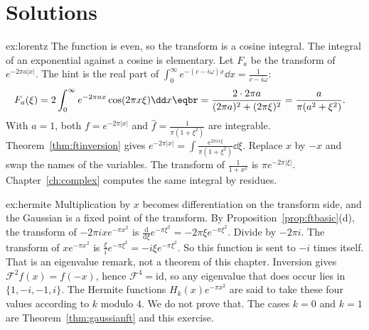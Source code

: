 \section{Solutions}

\begin{solution}{ex:lorentz}
\idea The function is even, so the transform is a cosine integral. The integral of an exponential against a cosine is elementary.
\writeup Let $F_a$ be the transform of $e^{-2\pi a|x|}$. The hint is the real part of $\int_0^\infty e^{-(c-i\omega)x}\dd x=\frac1{c-i\omega}$:
\[
\begin{aligned}F_a(\xi)&=2\int_0^\infty e^{-2\pi ax}\cos(2\pi x\xi)\dd x\eqbr=\frac{2\cdot2\pi a}{(2\pi a)^2+(2\pi\xi)^2}=\frac a{\pi(a^2+\xi^2)}.\end{aligned}
\]
With $a=1$, both $f=e^{-2\pi|x|}$ and $\hat f=\frac1{\pi(1+\xi^2)}$ are integrable. Theorem~\ref{thm:ftinversion} gives $e^{-2\pi|x|}=\int\frac{e^{2\pi ix\xi}}{\pi(1+\xi^2)}\dd\xi$. Replace $x$ by $-x$ and swap the names of the variables. The transform of $\frac1{1+x^2}$ is $\pi e^{-2\pi|\xi|}$. Chapter~\ref{ch:complex} computes the same integral by residues.
\end{solution}

\begin{solution}{ex:hermite}
\idea Multiplication by $x$ becomes differentiation on the transform side, and the Gaussian is a fixed point of the transform.
\writeup By Proposition~\ref{prop:ftbasic}(d), the transform of $-2\pi ixe^{-\pi x^2}$ is $\frac{\mathrm d}{\mathrm d\xi}e^{-\pi\xi^2}=-2\pi\xi e^{-\pi\xi^2}$. Divide by $-2\pi i$. The transform of $xe^{-\pi x^2}$ is $\frac{\xi}ie^{-\pi\xi^2}=-i\xi e^{-\pi\xi^2}$. So this function is sent to $-i$ times itself. That is an eigenvalue remark, not a theorem of this chapter. Inversion gives $\mathcal F^2f(x)=f(-x)$, hence $\mathcal F^4=\mathrm{id}$, so any eigenvalue that does occur lies in $\{1,-i,-1,i\}$. The Hermite functions $H_k(x)e^{-\pi x^2}$ are said to take these four values according to $k$ modulo $4$. We do not prove that. The cases $k=0$ and $k=1$ are Theorem~\ref{thm:gaussianft} and this exercise.
\end{solution}

